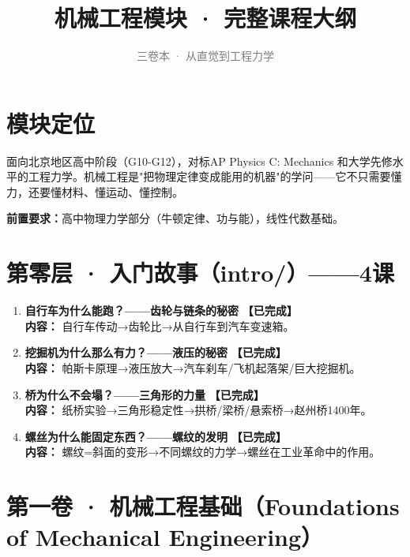 \documentclass[a4paper,11pt]{ctexart}
\title{\textcolor{blue!70!black}{\Huge\textbf{机械工程模块 · 完整课程大纲}}}
\subtitle{\textcolor{gray}{三卷本 · 从直觉到工程力学}}
\author{}
\date{}
\newcommand{\done}{\textcolor{green!50!black}{\textbf{【已完成】}}}
\begin{document}
\maketitle
\thispagestyle{empty}

\section*{模块定位}

面向北京地区高中阶段（G10-G12），对标AP Physics C: Mechanics 和大学先修水平的工程力学。机械工程是"把物理定律变成能用的机器"的学问——它不只需要懂力，还要懂材料、懂运动、懂控制。

\textbf{前置要求：}高中物理力学部分（牛顿定律、功与能），线性代数基础。

\section*{第零层 · 入门故事（intro/）——4课}

\begin{enumerate}
\item[\textbf{第1课}] \textbf{自行车为什么能跑？——齿轮与链条的秘密} \done \\
\textbf{内容：} 自行车传动→齿轮比→从自行车到汽车变速箱。
\item[\textbf{第2课}] \textbf{挖掘机为什么那么有力？——液压的秘密} \done \\
\textbf{内容：} 帕斯卡原理→液压放大→汽车刹车/飞机起落架/巨大挖掘机。
\item[\textbf{第3课}] \textbf{桥为什么不会塌？——三角形的力量} \done \\
\textbf{内容：} 纸桥实验→三角形稳定性→拱桥/梁桥/悬索桥→赵州桥1400年。
\item[\textbf{第4课}] \textbf{螺丝为什么能固定东西？——螺纹的发明} \done \\
\textbf{内容：} 螺纹=斜面的变形→不同螺纹的力学→螺丝在工业革命中的作用。
\end{enumerate}

\section*{第一卷 · 机械工程基础（Foundations of Mechanical Engineering）}
\end{document}
